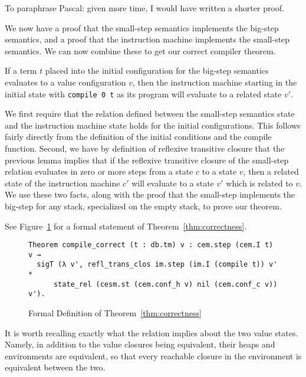 To paraphrase Pascal: given more time, I would have written a shorter proof.

We now have a proof that the small-step semantics implements the big-step
semantics, and a proof that the instruction machine implements the small-step
semantics. We can now combine these to get our correct compiler theorem. 

\begin{theorem} 
\label{thm:correctness}
If a term $t$ placed into the initial configuration for the big-step semantics
evaluates to a value configuration $v$, then the instruction machine starting
in the initial state with \texttt{compile 0 t} as its program will evaluate to a
related state $v'$.  
\end{theorem}
\begin{proofoutline}
We first require that the relation defined between the small-step semantics
state and the instruction machine state holds for the initial configurations.
This follows fairly directly from the definition of the initial conditions and
the compile function. Second, we have by definition of reflexive transitive
closure that the previous lemma implies that if the reflexive transitive
closure of the small-step relation evaluates in zero or more steps from a
state $c$ to a state $v$, then a related state of the instruction machine $c'$
will evaluate to a state $v'$ which is related to $v$. We use these two facts,
along with the proof that the small-step implements the big-step for any stack,
specialized on the empty stack, to prove our theorem. 
\end{proofoutline}

See Figure~\ref{fig:correctness_theorem} for a formal statement of
Theorem~\ref{thm:correctness}. 

\begin{figure}
\begin{lstlisting}
Theorem compile_correct (t : db.tm) v : cem.step (cem.I t) v → 
  sigT (λ v', refl_trans_clos im.step (im.I (compile t)) v' *
      state_rel (cesm.st (cem.conf_h v) nil (cem.conf_c v)) v').
\end{lstlisting}
\caption{Formal Definition of Theorem~\ref{thm:correctness}}
\label{fig:correctness_theorem}
\end{figure}

It is worth recalling exactly what the relation implies about the two value
states. Namely, in addition to the value closures being equivalent, their heaps
and environments are equivalent, so that every reachable closure in the
environment is equivalent between the two.


